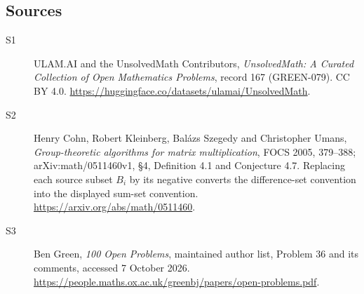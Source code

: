 \documentclass[11pt]{article}
\begin{document}
\subsection{Sources}
\begin{description}
\item[\hypertarget{source:167:1}{S1}] ULAM.AI and the UnsolvedMath Contributors, \emph{UnsolvedMath: A Curated Collection of Open Mathematics Problems}, record 167 (GREEN-079). CC BY 4.0. \url{https://huggingface.co/datasets/ulamai/UnsolvedMath}.
\item[\hypertarget{source:167:2}{S2}] Henry Cohn, Robert Kleinberg, Balázs Szegedy and Christopher Umans, \emph{Group-theoretic algorithms for matrix multiplication}, FOCS 2005, 379--388; arXiv:math/0511460v1, §4, Definition 4.1 and Conjecture 4.7. Replacing each source subset $B_i$ by its negative converts the difference-set convention into the displayed sum-set convention. \url{https://arxiv.org/abs/math/0511460}.
\item[\hypertarget{source:167:3}{S3}] Ben Green, \emph{100 Open Problems}, maintained author list, Problem 36 and its comments, accessed 7 October 2026. \url{https://people.maths.ox.ac.uk/greenbj/papers/open-problems.pdf}.
\end{description}
\label{end:167}
\end{document}
